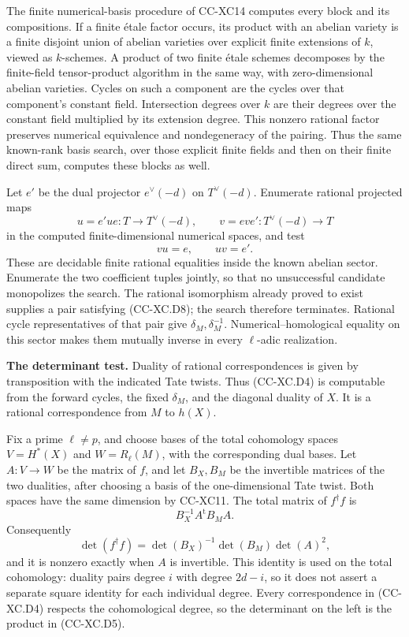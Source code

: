 The finite numerical-basis procedure of CC-XC14 computes every block and
its compositions. If a finite étale factor occurs, its product with an
abelian variety is a finite disjoint union of abelian varieties over
explicit finite extensions of \(k\), viewed as \(k\)-schemes. A product
of two finite étale schemes decomposes by the finite-field
tensor-product algorithm in the same way, with zero-dimensional abelian
varieties. Cycles on such a component are the cycles over that
component's constant field. Intersection degrees over \(k\) are their
degrees over the constant field multiplied by its extension degree. This
nonzero rational factor preserves numerical equivalence and
nondegeneracy of the pairing. Thus the same known-rank basis search,
over those explicit finite fields and then on their finite direct sum,
computes these blocks as well.

Let \(e'\) be the dual projector \(e^\vee(-d)\) on \(T^\vee(-d)\).
Enumerate rational projected maps \[
       u=e' u e:T\longrightarrow T^\vee(-d),\qquad
       v=e v e':T^\vee(-d)\longrightarrow T
 \] in the computed finite-dimensional numerical spaces, and test \[
                        vu=e,\qquad uv=e'.              \tag{CC-XC.D8}
\] These are decidable finite rational equalities inside the known
abelian sector. Enumerate the two coefficient tuples jointly, so that no
unsuccessful candidate monopolizes the search. The rational isomorphism
already proved to exist supplies a pair satisfying (CC-XC.D8); the
search therefore terminates. Rational cycle representatives of that pair
give \(\delta_M,\delta_M^{-1}\). Numerical--homological equality on this
sector makes them mutually inverse in every \(\ell\)-adic realization.

\textbf{The determinant test.} Duality of rational correspondences is
given by transposition with the indicated Tate twists. Thus (CC-XC.D4)
is computable from the forward cycles, the fixed \(\delta_M\), and the
diagonal duality of \(X\). It is a rational correspondence from \(M\) to
\(h(X)\).

Fix a prime \(\ell\ne p\), and choose bases of the total cohomology
spaces \(V=H^*(X)\) and \(W=R_\ell(M)\), with the corresponding dual
bases. Let \(A:V\to W\) be the matrix of \(f\), and let \(B_X,B_M\) be
the invertible matrices of the two dualities, after choosing a basis of
the one-dimensional Tate twist. Both spaces have the same dimension by
CC-XC11. The total matrix of \(f^\dagger f\) is \[
                         B_X^{-1}A^{\mathrm t}B_M A.
                                                        \tag{CC-XC.D9}
\] Consequently \[
       \det(f^\dagger f)
           =\det(B_X)^{-1}\det(B_M)\det(A)^2,
                                                        \tag{CC-XC.D10}
\] and it is nonzero exactly when \(A\) is invertible. This identity is
used on the total cohomology: duality pairs degree \(i\) with degree
\(2d-i\), so it does not assert a separate square identity for each
individual degree. Every correspondence in (CC-XC.D4) respects the
cohomological degree, so the determinant on the left is the product in
(CC-XC.D5).

